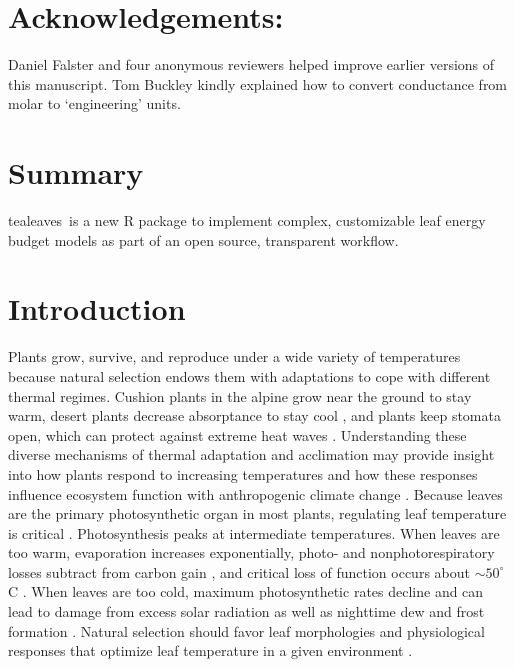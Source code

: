 \documentclass[11pt, oneside]{article}
\newcommand{\pkg}[1]{{\fontseries{b}\selectfont #1}}
\newcommand{\tealeaves}{\pkg{tealeaves}}
\begin{document}
\section*{Acknowledgements:}  

Daniel Falster and four anonymous reviewers helped improve earlier versions of this manuscript. Tom Buckley kindly explained how to convert conductance from molar to `engineering' units.

\clearpage


\onehalfspacing

\section*{Summary}

\tealeaves~is a new R package to implement complex, customizable leaf energy budget models as part of an open source, transparent workflow.

\section*{Introduction}

Plants grow, survive, and reproduce under a wide variety of temperatures because natural selection endows them with adaptations to cope with different thermal regimes. Cushion plants in the alpine grow near the ground to stay warm, desert plants decrease absorptance to stay cool \citep{Ehleringer_etal_1976}, and plants keep stomata open, which can protect against extreme heat waves \citep{Drake_etal_2018}. Understanding these diverse mechanisms of thermal adaptation and acclimation may provide insight into how plants respond to increasing temperatures and how these responses influence ecosystem function with anthropogenic climate change \citep{Rogers_etal_2017, Crous_2019}. Because leaves are the primary photosynthetic organ in most plants, regulating leaf temperature is critical \citep{Berry_Bjorkman_1980}. Photosynthesis peaks at intermediate temperatures\citep{Sage_Kubien_2007}. When leaves are too warm, evaporation increases exponentially, photo- and nonphotorespiratory losses subtract from carbon gain \citep{Jones_2014}, and critical loss of function occurs about $\sim 50^{\circ}$ C \citep{Osullivan_etal_2017}. When leaves are too cold, maximum photosynthetic rates decline and can lead to damage from excess solar radiation \citep{Huner_etal_1993} as well as nighttime dew and frost formation \citep{Jordan_Smith_1994}. Natural selection should favor leaf morphologies and physiological responses that optimize leaf temperature in a given environment \citep{Parkhurst_Loucks_1972, Okajima_etal_2012, Michaletz_etal_2016}.
\end{document}
